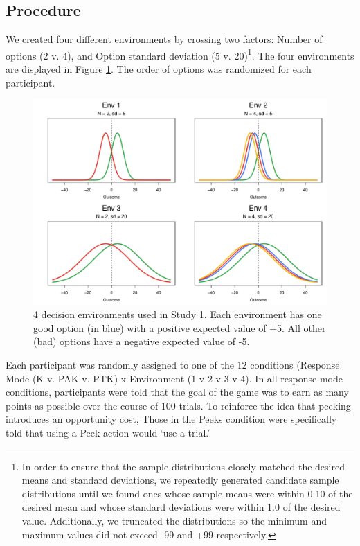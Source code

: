 \documentclass[a4paper,doc,natbib,floatsintext]{apa6}\usepackage[]{graphicx}\usepackage[]{color}
\begin{document}
\subsection{Procedure}

We created four different environments by crossing two factors: Number of options (2 v. 4), and Option standard deviation (5 v. 20)\footnote{In order to ensure that the sample distributions closely matched the desired means and standard deviations, we repeatedly generated candidate sample distributions until we found ones whose sample means were within 0.10 of the desired mean and whose standard deviations were within 1.0 of the desired value. Additionally, we truncated the distributions so the minimum and maximum values did not exceed -99 and +99 respectively.}. The four environments are displayed in Figure \ref{fig:distributions}. The order of options was randomized for each participant.



\begin{figure}
\includegraphics[width=\columnwidth]{figures/distributions.pdf}
\caption{4 decision environments used in Study 1. Each environment has one good option (in blue) with a positive expected value of +5. All other (bad) options have a negative expected value of -5.}
\label{fig:distributions}
\end{figure}


Each participant was randomly assigned to one of the 12 conditions (Response Mode (K v. PAK v. PTK) x Environment (1 v 2 v 3 v 4). In all response mode conditions, participants were told that the goal of the game was to earn as many points as possible over the course of 100 trials. To reinforce the idea that peeking introduces an opportunity cost, Those in the Peeks condition were specifically told that using a Peek action would `use a trial.'
\end{document}

